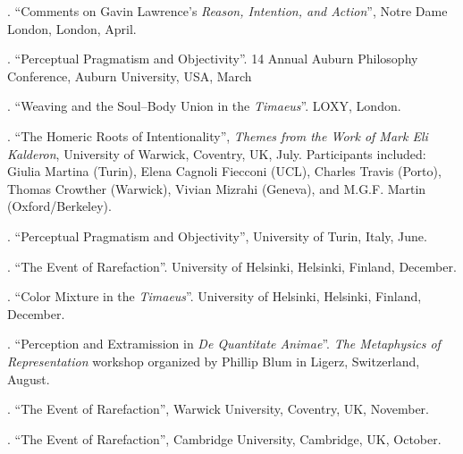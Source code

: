 \documentclass[11pt]{article}
\begin{document}

 \bigskip

\medskip

. ``Comments on Gavin Lawrence's \emph{Reason, Intention, and Action}'', Notre Dame London, London, April.

. ``Perceptual Pragmatism and Objectivity''. 14 Annual Auburn Philosophy Conference, Auburn University, USA, March

. ``Weaving and the Soul–Body Union in the \emph{Timaeus}''. LOXY, London.

. ``The Homeric Roots of Intentionality'', \emph{Themes from the Work of Mark Eli Kalderon}, University of Warwick, Coventry, UK, July. Participants included: Giulia Martina (Turin), Elena Cagnoli Fiecconi (UCL), Charles Travis (Porto), Thomas Crowther (Warwick), Vivian Mizrahi (Geneva), and M.G.F. Martin (Oxford/Berkeley).

. ``Perceptual Pragmatism and Objectivity'', University of Turin, Italy, June.

. ``The Event of Rarefaction''. University of Helsinki, Helsinki, Finland, December.

. ``Color Mixture in the \emph{Timaeus}''. University of Helsinki, Helsinki, Finland, December.

. ``Perception and Extramission in \emph{De Quantitate Animae}''. \emph{The Metaphysics of Representation} workshop organized by Phillip Blum in Ligerz, Switzerland, August.

. ``The Event of Rarefaction'', Warwick University, Coventry, UK, November.

. ``The Event of Rarefaction'', Cambridge University, Cambridge, UK, October.
\end{document}
